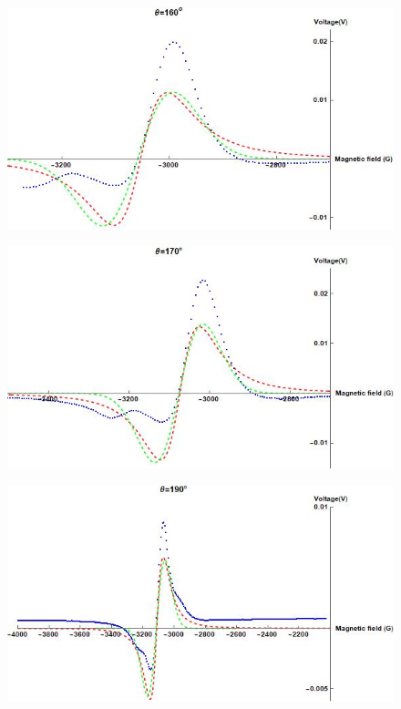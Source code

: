 \documentclass[openany,11pt,a4paper]{report}
\begin{document}
\begin{figure}[H]
\centering
\includegraphics[scale=0.6]{160.jpg}
\end{figure}


\begin{figure}[H]
\centering
\includegraphics[scale=0.6]{170.jpg}
\end{figure}


\begin{figure}[H]
\centering
\includegraphics[scale=0.6]{190.jpg}
\end{figure}
\end{document}
